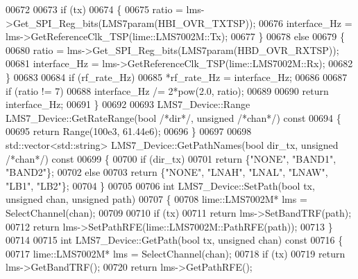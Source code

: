 \begin{DoxyCode}
00672 
00673     \textcolor{keywordflow}{if} (tx)
00674     \{
00675         ratio = lms->Get_SPI_Reg_bits(LMS7param(HBI_OVR_TXTSP));
00676         interface\_Hz = lms->GetReferenceClk_TSP(lime::LMS7002M::Tx);
00677     \}
00678     \textcolor{keywordflow}{else}
00679     \{
00680         ratio = lms->Get_SPI_Reg_bits(LMS7param(HBD_OVR_RXTSP));
00681         interface\_Hz = lms->GetReferenceClk_TSP(lime::LMS7002M::Rx);
00682     \}
00683 
00684     \textcolor{keywordflow}{if} (rf\_rate\_Hz)
00685         *rf\_rate\_Hz = interface\_Hz;
00686 
00687     \textcolor{keywordflow}{if} (ratio != 7)
00688         interface\_Hz /= 2*pow(2.0, ratio);
00689 
00690     \textcolor{keywordflow}{return} interface\_Hz;
00691 \}
00692 
00693 LMS7_Device::Range LMS7_Device::GetRateRange(\textcolor{keywordtype}{bool} \textcolor{comment}{/*dir*/}, \textcolor{keywordtype}{unsigned} \textcolor{comment}{/*chan*/})\textcolor{keyword}{ const}
00694 \textcolor{keyword}{}\{
00695     \textcolor{keywordflow}{return} Range(100e3, 61.44e6);
00696 \}
00697 
00698 std::vector<std::string> LMS7_Device::GetPathNames(\textcolor{keywordtype}{bool} dir_tx, \textcolor{keywordtype}{unsigned} \textcolor{comment}{/*chan*/})\textcolor{keyword}{ const}
00699 \textcolor{keyword}{}\{
00700     \textcolor{keywordflow}{if} (dir\_tx)
00701         \textcolor{keywordflow}{return} \{\textcolor{stringliteral}{"NONE"}, \textcolor{stringliteral}{"BAND1"}, \textcolor{stringliteral}{"BAND2"}\};
00702     \textcolor{keywordflow}{else}
00703         \textcolor{keywordflow}{return} \{\textcolor{stringliteral}{"NONE"}, \textcolor{stringliteral}{"LNAH"}, \textcolor{stringliteral}{"LNAL"}, \textcolor{stringliteral}{"LNAW"}, \textcolor{stringliteral}{"LB1"}, \textcolor{stringliteral}{"LB2"}\};
00704 \}
00705 
00706 \textcolor{keywordtype}{int} LMS7_Device::SetPath(\textcolor{keywordtype}{bool} tx, \textcolor{keywordtype}{unsigned} chan, \textcolor{keywordtype}{unsigned} path)
00707 \{
00708     lime::LMS7002M* lms = SelectChannel(chan);
00709 
00710     \textcolor{keywordflow}{if} (tx)
00711         \textcolor{keywordflow}{return} lms->SetBandTRF(path);
00712     \textcolor{keywordflow}{return} lms->SetPathRFE(lime::LMS7002M::PathRFE(path));
00713 \}
00714 
00715 \textcolor{keywordtype}{int} LMS7_Device::GetPath(\textcolor{keywordtype}{bool} tx, \textcolor{keywordtype}{unsigned} chan)\textcolor{keyword}{ const}
00716 \textcolor{keyword}{}\{
00717     lime::LMS7002M* lms = SelectChannel(chan);
00718     \textcolor{keywordflow}{if} (tx)
00719         \textcolor{keywordflow}{return} lms->GetBandTRF();
00720     \textcolor{keywordflow}{return} lms->GetPathRFE();

\end{DoxyCode}
